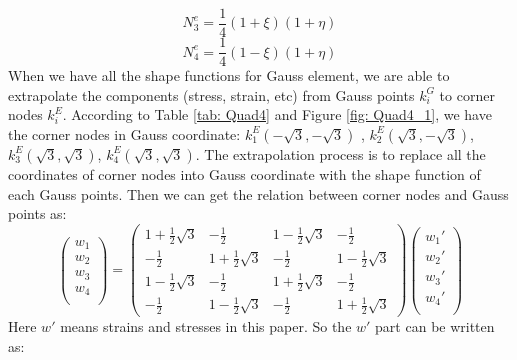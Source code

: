 \begin{equation}
N_3^e = \frac{1}{4} \left(1 + \xi\right) \left( 1 + \eta\right)
\end{equation}
\begin{equation}
N_4^e = \frac{1}{4} \left(1 - \xi\right) \left( 1 + \eta\right)
\end{equation}
When we have all the shape functions for Gauss element, we are able to extrapolate the components (stress, strain, etc) from Gauss points $k_i^G$ to corner nodes $k_i^E$. According to Table \ref{tab: Quad4} and  Figure \ref{fig: Quad4_1}, we have the corner nodes in Gauss coordinate: $k_1^E(-\sqrt{3}, -\sqrt{3})$ , $k_2^E(\sqrt{3}, -\sqrt{3})$, $k_3^E(\sqrt{3}, \sqrt{3})$, $k_4^E(\sqrt{3}, \sqrt{3})$. The extrapolation process is to replace all the coordinates of corner nodes into Gauss coordinate with the shape function of each Gauss points. Then we can get the relation between corner nodes and Gauss points as:
\begin{equation}
\begin{pmatrix}
w_1 \\
w_2 \\
w_3 \\
w_4 \\
\end{pmatrix} = \begin{pmatrix}
1 + \frac{1}{2} \sqrt{3} & -\frac{1}{2} &  1 - \frac{1}{2} \sqrt{3} &  -\frac{1}{2}       \\[0.3em]
-\frac{1}{2} & 1 + \frac{1}{2} \sqrt{3} & -\frac{1}{2} &  1 - \frac{1}{2} \sqrt{3}            \\[0.3em]
1 - \frac{1}{2} \sqrt{3} & -\frac{1}{2}  & 1 + \frac{1}{2} \sqrt{3} &  -\frac{1}{2}         \\[0.3em]
-\frac{1}{2} &  1 - \frac{1}{2} \sqrt{3} & -\frac{1}{2} &   1 + \frac{1}{2} \sqrt{3}                             
\end{pmatrix} \begin{pmatrix}
{w_1}' \\
{w_2}' \\
{w_3}' \\
{w_4}' \\
\end{pmatrix}
\end{equation}	
Here $w'$ means strains and stresses in this paper. So the $w'$ part can be written as:
